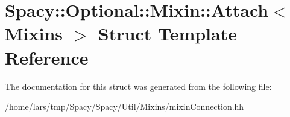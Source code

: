 \hypertarget{structSpacy_1_1Optional_1_1Mixin_1_1Attach}{}\section{Spacy\+:\+:Optional\+:\+:Mixin\+:\+:Attach$<$ Mixins $>$ Struct Template Reference}
\label{structSpacy_1_1Optional_1_1Mixin_1_1Attach}


The documentation for this struct was generated from the following file\+:\begin{DoxyCompactItemize}
\item 
/home/lars/tmp/\+Spacy/\+Spacy/\+Util/\+Mixins/mixin\+Connection.\+hh\end{DoxyCompactItemize}

